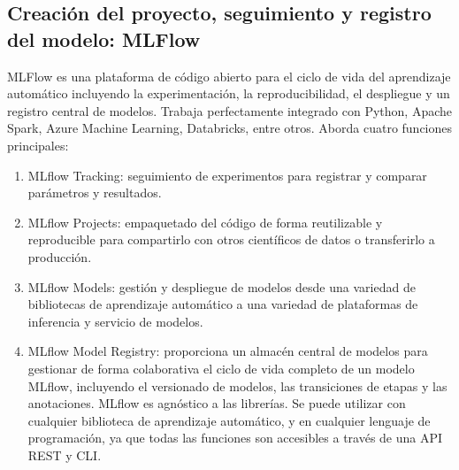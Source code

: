 \subsection{Creación del proyecto, seguimiento y registro del modelo: MLFlow}
MLFlow es una plataforma de código abierto para el ciclo de vida del aprendizaje automático incluyendo la experimentación, la reproducibilidad, el despliegue y un registro central de modelos. Trabaja perfectamente integrado con Python, Apache Spark, Azure Machine Learning, Databricks, entre otros.
Aborda cuatro funciones principales:
\begin{enumerate}
\item MLflow Tracking: seguimiento de experimentos para registrar y comparar parámetros y resultados.
\item MLflow Projects: empaquetado del código de forma reutilizable y reproducible para compartirlo con otros científicos de datos o transferirlo a producción. 
\item MLflow Models: gestión y despliegue de modelos desde una variedad de bibliotecas de aprendizaje automático a una variedad de plataformas de inferencia y servicio de modelos. 
\item MLflow Model Registry: proporciona un almacén central de modelos para gestionar de forma colaborativa el ciclo de vida completo de un modelo MLflow, incluyendo el versionado de modelos, las transiciones de etapas y las anotaciones.
MLflow es agnóstico a las librerías. Se puede utilizar con cualquier biblioteca de aprendizaje automático, y en cualquier lenguaje de programación, ya que todas las funciones son accesibles a través de una API REST y CLI.
\end{enumerate}

